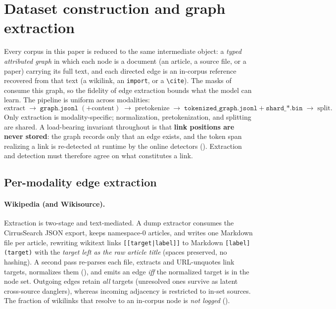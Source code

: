 \section{Dataset construction and graph extraction}
\label{app:datasets}

Every corpus in this paper is reduced to the same intermediate object: a
\emph{typed attributed graph} in which each node is a document (an article, a
source file, or a paper) carrying its full text, and each directed edge is an
in-corpus reference recovered from that text (a wikilink, an \texttt{import}, or
a \texttt{\textbackslash cite}). The masks of  consume this
graph, so the fidelity of edge extraction bounds what the model can learn. The
pipeline is uniform across modalities:
\[
\text{extract} \;\to\; \texttt{graph.jsonl}\;(+\text{content}) \;\to\;
\text{pretokenize} \;\to\; \texttt{tokenized\_graph.jsonl}+\texttt{shard\_*.bin}
\;\to\; \text{split}.
\]
Only extraction is modality-specific; normalization, pretokenization, and
splitting are shared. A load-bearing invariant throughout is that
\textbf{link positions are never stored}: the graph records only that an edge
exists, and the token span realizing a link is re-detected at runtime by the
online detectors (). Extraction and detection must therefore
agree on what constitutes a link.

\subsection{Per-modality edge extraction}

\paragraph{Wikipedia (and Wikisource).}
Extraction is two-stage and text-mediated. A dump extractor consumes the
CirrusSearch JSON export, keeps namespace-0 articles, and writes one Markdown
file per article, rewriting wikitext links \texttt{[[target|label]]} to Markdown
\texttt{[label](target)} with the \emph{target left as the raw article title}
(spaces preserved, no hashing). A second pass re-parses each file, extracts and
URL-unquotes link targets, normalizes them (), and emits
an edge \emph{iff} the normalized target is in the node set. Outgoing edges
retain \emph{all} targets (unresolved ones survive as latent cross-source
danglers), whereas incoming adjacency is restricted to in-set sources. The
fraction of wikilinks that resolve to an in-corpus node is \emph{not logged}
().

